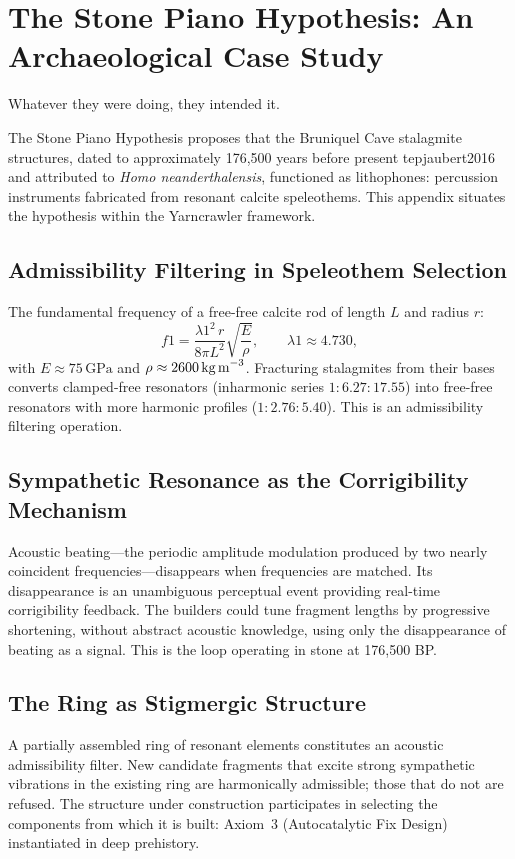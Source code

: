 \chapter{The Stone Piano Hypothesis: An Archaeological Case Study}
\label{app:stone piano}

\epigraph{Whatever they were doing, they intended it.}{}

The Stone Piano Hypothesis proposes that the Bruniquel Cave stalagmite structures,
dated to approximately 176,500 years before present 	tep{jaubert2016} and attributed to \emph{Homo
neanderthalensis}, functioned as lithophones: percussion instruments fabricated
from resonant calcite speleothems. This appendix situates the hypothesis within
the Yarncrawler framework.

\section{Admissibility Filtering in Speleothem Selection}

The fundamental frequency of a free-free calcite rod of length $L$ and radius $r$:
\[
  f 1 = \frac{\lambda 1^2\, r}{8\pi L^2}\sqrt{\frac{E}{\rho}},
  \qquad \lambda 1 \approx 4.730,
\]
with $E \approx 75\,\text{GPa}$ and $\rho \approx 2600\,\text{kg\,m}^{-3}$.
Fracturing stalagmites from their bases converts clamped-free resonators
(inharmonic series $1 : 6.27 : 17.55$) into free-free resonators with more harmonic
profiles ($1 : 2.76 : 5.40$). This is an admissibility filtering operation.

\section{Sympathetic Resonance as the Corrigibility Mechanism}

Acoustic beating---the periodic amplitude modulation produced by two nearly
coincident frequencies---disappears when frequencies are matched. Its disappearance
is an unambiguous perceptual event providing real-time corrigibility feedback. The
builders could tune fragment lengths by progressive shortening, without abstract
acoustic knowledge, using only the disappearance of beating as a signal. This is the
\KES loop operating in stone at 176,500 BP.

\section{The Ring as Stigmergic Structure}

A partially assembled ring of resonant elements constitutes an acoustic admissibility
filter. New candidate fragments that excite strong sympathetic vibrations in the
existing ring are harmonically admissible; those that do not are refused. The
structure under construction participates in selecting the components from which it
is built: Axiom~3 (Autocatalytic Fix Design) instantiated in deep prehistory.

